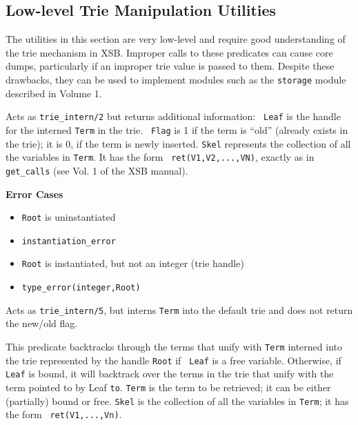
\subsection{Low-level Trie Manipulation Utilities} \label{sec:intern-advanced}

The utilities in this section are very low-level and require good
understanding of the trie mechanism in XSB.  Improper calls to these
predicates can cause core dumps, particularly if an improper trie
value is passed to them.  Despite these drawbacks, they can be used to
implement modules such as the {\tt storage} module described in Volume
1.

\begin{description}
Acts as {\tt trie\_intern/2} but returns additional information: {\tt
  Leaf} is the handle for the interned {\tt Term} in the trie.  {\tt
  Flag} is 1 if the term is ``old'' (already exists in the trie); it
is 0, if the term is newly inserted.  {\tt Skel} represents the
collection of all the variables in {\tt Term}. It has the form {\tt
  ret(V1,V2,...,VN)}, exactly as in {\tt get\_calls} (see Vol. 1 of
the XSB manual).

{\bf Error Cases}
\begin{itemize}
\item 	{\tt Root} is uninstantiated
\bi
\item 	 {\tt instantiation\_error}
\ei
\item 	{\tt Root} is instantiated, but not an integer (trie handle)
\bi
\item 	 {\tt type\_error(integer,Root)}
\ei
\end{itemize}

Acts as {\tt trie\_intern/5}, but interns {\tt Term} into the default
trie and does not return the new/old flag.

This predicate backtracks through the terms that unify with {\tt Term}
interned into the trie represented by the handle {\tt Root} if {\tt
  Leaf} is a free variable.  Otherwise, if {\tt Leaf} is bound, it
will backtrack over the terms in the trie that unify with the term
pointed to by Leaf {\tt to}.  {\tt Term} is the term to be retrieved;
it can be either (partially) bound or free.  {\tt Skel} is the
collection of all the variables in {\tt Term}; it has the form {\tt
  ret(V1,...,Vn)}.


\end{description}
